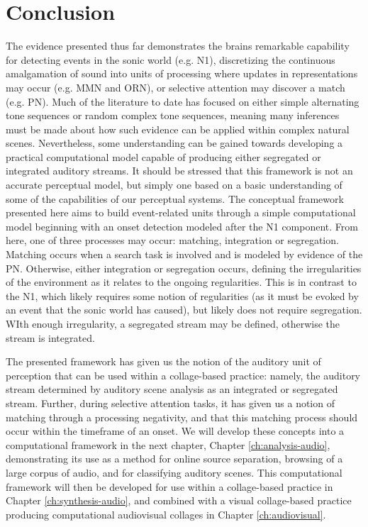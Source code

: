 \documentclass[a4paper,10pt,final]{ThesisStyle}
\begin{document}

\section{Conclusion}

The evidence presented thus far demonstrates the brains remarkable capability for detecting events in the sonic world (e.g. N1), discretizing the continuous amalgamation of sound into units of processing where updates in representations may occur (e.g. MMN and ORN), or selective attention may discover a match (e.g. PN).  Much of the literature to date has focused on either simple alternating tone sequences or random complex tone sequences, meaning many inferences must be made about how such evidence can be applied within complex natural scenes.  Nevertheless, some understanding can be gained towards developing a practical computational model capable of producing either segregated or integrated auditory streams.  It should be stressed that this framework is not an accurate perceptual model, but simply one based on a basic understanding of some of the capabilities of our perceptual systems.  The conceptual framework presented here aims to build event-related units through a simple computational model beginning with an onset detection modeled after the N1 component.  From here, one of three processes may occur: matching, integration or segregation.  Matching occurs when a search task is involved and is modeled by evidence of the PN.  Otherwise, either integration or segregation occurs, defining the irregularities of the environment as it relates to the ongoing regularities.  This is in contrast to the N1, which likely requires some notion of regularities (as it must be evoked by an event that the sonic world has caused), but likely does not require segregation. WIth enough irregularity, a segregated stream may be defined, otherwise the stream is integrated.  

The presented framework has given us the notion of the auditory unit of perception that can be used within a collage-based practice: namely, the auditory stream determined by auditory scene analysis as an integrated or segregated stream.  Further, during selective attention tasks, it has given us a notion of matching through a processing negativity, and that this matching process should occur within the timeframe of an onset.  We will develop these concepts into a computational framework in the next chapter, Chapter \ref{ch:analysis-audio}, demonstrating its use as a method for online source separation, browsing of a large corpus of audio, and for classifying auditory scenes.  This computational framework will then be developed for use within a collage-based practice in Chapter \ref{ch:synthesis-audio}, and combined with a visual collage-based practice producing computational audiovisual collages in Chapter \ref{ch:audiovisual}.
\end{document}
